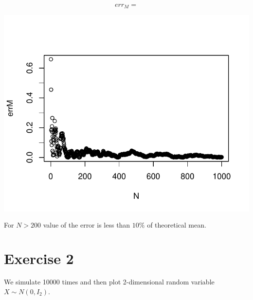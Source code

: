 \documentclass[12pt, a4paper]{article}\usepackage[]{graphicx}\usepackage[]{color}
\makeatletter
\def\maxwidth{ %
  \ifdim\Gin@nat@width>\linewidth
    \linewidth
  \else
    \Gin@nat@width
  \fi
}
\newenvironment{knitrout}{}{} %
\makeatother
\begin{document}
\[ err_M = \]

\begin{knitrout}
\color{fgcolor}

{\centering \includegraphics[width=\maxwidth]{figure/ex1_2err-1} 

}



\end{knitrout}

For $N>200$ value of the error is less than $10\%$ of theoretical mean.



\section{Exercise 2}

We simulate 10000 times and then plot 2-dimensional random variable $X\sim N(0,I_2)$.
\end{document}
